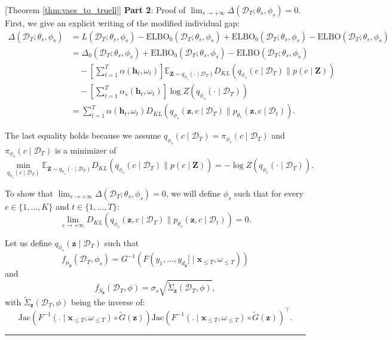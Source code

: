 \documentclass[10pt]{article} %
\newcommand{\BlackBox}{\rule{1.5ex}{1.5ex}}  %
\renewenvironment{proof}{\par\noindent{\bf Proof\ }}{\hfill\BlackBox\\[2mm]}
\newenvironment{proof}{\par\noindent{\bf Proof\ }}{\hfill\BlackBox\\[2mm]}
\begin{document}
\begin{proof}[Theorem \ref{thm:vaes_to_truell}]
\textbf{Part 2}: Proof of $\lim_{s \to + \infty}  \Delta(\mathcal{D}_T; \theta_{s}, \phi_{s}) = 0$. \\
First, we give an explicit writing of the modified individual gap: 
\begin{equation*}
    \begin{split}
        \Delta(\mathcal{D}_T; \theta_{s}, \phi_{s}) &= L(\mathcal{D}_T; \theta_{s}, \phi_{s}) - \mathrm{ELBO_0}(\mathcal{D}_T; \theta_{s}, \phi_{s}) +  \mathrm{ELBO_0}(\mathcal{D}_T; \theta_{s}, \phi_{s}) - \mathrm{ELBO}(\mathcal{D}_T; \theta_{s}, \phi_{s}) \\
        &= \Delta_0(\mathcal{D}_T; \theta_{s}, \phi_{s}) +  \mathrm{ELBO_0}(\mathcal{D}_T; \theta_{s}, \phi_{s}) - \mathrm{ELBO}(\mathcal{D}_T; \theta_{s}, \phi_{s}) \\
        &\quad - \left[\sum_{t = 1}^{T}\alpha(\mathbf{h}_t, \omega_t)\right] \mathbb{E}_{\mathbf{Z} \sim q_{\phi_s}(\cdot \mid \mathcal{D}_T)} D_{KL}(q_{\phi_s}(c \mid \mathcal{D}_T) \parallel p(c \mid \mathbf{Z})) \\
        &\quad - \left[\sum_{t = 1}^{T}\alpha_s(\mathbf{h}_t, \omega_t)\right]\log Z(q_{\phi_s}(\cdot \mid \mathcal{D}_T)) \\
        &= \sum_{t = 1}^{T} \alpha(\mathbf{h}_t, \omega_t) D_{KL}(q_{\phi_s}(\mathbf{z}, c \mid \mathcal{D}_T) \parallel p_{\theta_s}(\mathbf{z}, c \mid \mathcal{D}_t)).
    \end{split}
\end{equation*}

The last equality holds because we assume $q_{\phi_s}(c \mid \mathcal{D}_T) = \pi_{\phi_s}(c \mid \mathcal{D}_T)$ and $\pi_{\phi_s}(c \mid \mathcal{D}_T)$ is a minimizer of 
\[
\min_{q_{\phi_s}(c \mid \mathcal{D}_T)} \mathbb{E}_{\mathbf{Z} \sim q_{\phi_s}(\cdot \mid \mathcal{D}_T)} D_{KL}(q_{\phi_s}(c \mid \mathcal{D}_T) \parallel p(c \mid \mathbf{Z})) = -\log Z(q_{\phi_s}(\cdot \mid \mathcal{D}_T)).
\]

To show that $\lim_{s \to + \infty}  \Delta(\mathcal{D}_T; \theta_{s}, \phi_{s}) = 0$, we will define $\phi_{s}$ such that for every $c \in \{1, \dots, K\}$ and \(t \in \{1, \dots, T\}\):
\[
\lim_{s \to + \infty} D_{KL}(q_{\phi_{s}}(\mathbf{z}, c \mid \mathcal{D}_T) \parallel p_{\theta_s}(\mathbf{z}, c \mid \mathcal{D}_t)) = 0.
\]

Let us define $q_{\phi_{s}}( \mathbf{z} \mid \mathcal{D}_T)$ such that 
\[
f_{\mu_{\mathbf{z}}}(\mathcal{D}_T, \phi_{s}) = G^{-1}(F(y_1, \dots, y_{d_{\mathbf{z}}}] \mid \mathbf{x}_{\leq T}, \omega_{\leq T}))
\]
and 
\[
f_{S_{\mathbf{z}}}(\mathcal{D}_T, \phi) = \sigma_{s} \sqrt{\tilde{\Sigma}_{\mathbf{z}}(\mathcal{D}_T, \phi)},
\]
with $\tilde{\Sigma}_{\mathbf{z}}(\mathcal{D}_T, \phi)$ being the inverse of:
\[
\mathrm{Jac}(F^{-1}(. \mid \mathbf{x}_{\leq T}, \omega_{\leq T}) \circ \tilde{G}(\mathbf{z}))\mathrm{Jac}(F^{-1}(. \mid \mathbf{x}_{\leq T}, \omega_{\leq T}) \circ \tilde{G}(\mathbf{z}))^{\top}.
\]


\end{proof}
\end{document}
